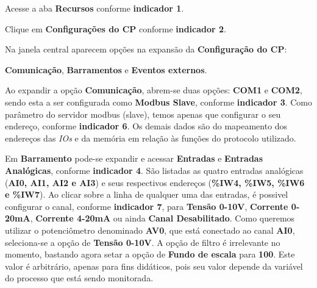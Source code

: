 Acesse a aba \textbf{Recursos} conforme \textbf{indicador 1}.

Clique em \textbf{Configurações do CP} conforme \textbf{indicador 2}.

Na janela central aparecem opções na expansão da \textbf{Configuração do CP}: 

\textbf{Comunicação}, 
\textbf{Barramentos} e 
\textbf{Eventos externos}.

\begin{figure}[ht!]
	\centering
\end{figure}


Ao expandir a opção \textbf{Comunicação}, abrem-se duas opções: \textbf{COM1} e \textbf{COM2}, sendo esta a ser configurada como \textbf{Modbus Slave}, conforme \textbf{indicador 3}. 
Como parâmetro do servidor modbus (slave), temos apenas que configurar o seu endereço, conforme \textbf{indicador 6}. 
Os demais dados são do mapeamento dos endereços das \textit{IOs} e da memória em relação às funções do protocolo utilizado.

Em \textbf{Barramento} pode-se expandir e acessar 
\textbf{Entradas} e \textbf{Entradas Analógicas}, 
conforme \textbf{indicador 4}. 
São listadas as quatro entradas analógicas (\textbf{AI0, AI1, AI2 e AI3}) e seus respectivos endereços (\textbf{\%IW4, \%IW5, \%IW6 e \%IW7}). 
Ao clicar sobre a linha de qualquer uma das entradas, é possivel configurar o canal, conforme \textbf{indicador 7}, 
para \textbf{Tensão 0-10V}, \textbf{Corrente 0-20mA}, \textbf{Corrente 4-20mA} ou ainda \textbf{Canal Desabilitado}. 
Como queremos utilizar o potenciômetro denominado \textbf{AV0}, 
que está conectado ao canal \textbf{AI0}, 
seleciona-se a opção de \textbf{Tensão 0-10V}. 
A opção de filtro é irrelevante no momento, 
bastando agora setar a opção de \textbf{Fundo de escala} para \textbf{100}. 
Este valor é arbitrário, apenas para fins didáticos, pois seu valor depende da variável do processo que está sendo monitorada.



